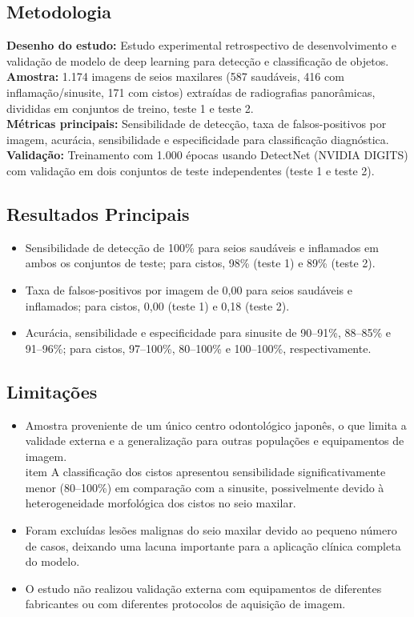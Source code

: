 \subsection{Metodologia}
\textbf{Desenho do estudo:} Estudo experimental retrospectivo de desenvolvimento
e validação de modelo de deep learning para detecção e classificação de objetos. \\
\textbf{Amostra:} 1.174 imagens de seios maxilares (587 saudáveis, 416 com
inflamação/sinusite, 171 com cistos) extraídas de radiografias panorâmicas,
divididas em conjuntos de treino, teste 1 e teste 2. \\
\textbf{Métricas principais:} Sensibilidade de detecção, taxa de falsos-positivos
por imagem, acurácia, sensibilidade e especificidade para classificação
diagnóstica. \\
\textbf{Validação:} Treinamento com 1.000 épocas usando DetectNet (NVIDIA DIGITS)
com validação em dois conjuntos de teste independentes (teste 1 e teste 2).

\subsection{Resultados Principais}
\begin{itemize}
  \item Sensibilidade de detecção de 100\% para seios saudáveis e inflamados
        em ambos os conjuntos de teste; para cistos, 98\% (teste 1) e 89\%
        (teste 2).
  \item Taxa de falsos-positivos por imagem de 0,00 para seios saudáveis e
        inflamados; para cistos, 0,00 (teste 1) e 0,18 (teste 2).
  \item Acurácia, sensibilidade e especificidade para sinusite de 90--91\%,
        88--85\% e 91--96\%; para cistos, 97--100\%, 80--100\% e 100--100\%,
        respectivamente.
\end{itemize}

\subsection{Limitações}
\begin{itemize}
  \item Amostra proveniente de um único centro odontológico japonês, o que
        limita a validade externa e a generalização para outras populações e
        equipamentos de imagem.
  \\item A classificação dos cistos apresentou sensibilidade significativamente
        menor (80--100\%) em comparação com a sinusite, possivelmente devido
        à heterogeneidade morfológica dos cistos no seio maxilar.
  \item Foram excluídas lesões malignas do seio maxilar devido ao pequeno
        número de casos, deixando uma lacuna importante para a aplicação
        clínica completa do modelo.
  \item O estudo não realizou validação externa com equipamentos de diferentes
        fabricantes ou com diferentes protocolos de aquisição de imagem.
\end{itemize}

